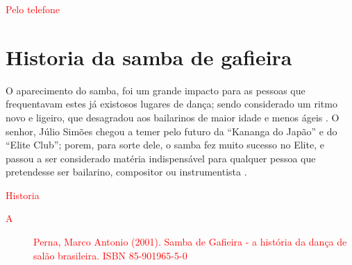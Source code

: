 \textcolor{red}{Pelo telefone}



\section{Historia da samba de gafieira}


O aparecimento do samba, 
foi um grande impacto para as pessoas que frequentavam estes já existosos lugares de dança;
sendo considerado um ritmo novo e ligeiro,
que desagradou aos bailarinos de maior idade e menos ágeis \cite[pp. 3]{entrevistajuliojournalbrasil1}.
O senhor, Júlio Simões chegou a temer pelo futuro da ``Kananga do Japão'' e
do ``Elite Club''; porem, para sorte dele, 
o samba fez muito sucesso no Elite,
e passou a ser considerado matéria indispensável para qualquer pessoa que pretendesse ser bailarino, 
compositor ou instrumentista \cite[pp. 3]{entrevistajuliojournalbrasil1}.

\textcolor{red}{Historia
\begin{description}
\item [A] Perna, Marco Antonio (2001). Samba de Gafieira - a história da dança de salão brasileira. ISBN 85-901965-5-0
\end{description}
}



